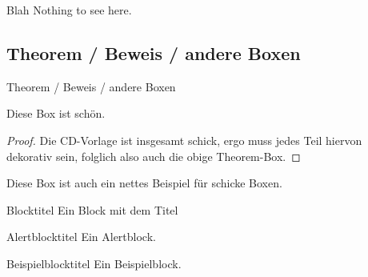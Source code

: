 \documentclass[utf8]{beamer}
\begin{document}
\begin{frame}{Blah}
Nothing to see here.
\end{frame}

\subsection{Theorem / Beweis / andere Boxen} 

\begin{frame}[allowframebreaks]{Theorem / Beweis / andere Boxen} %
   \begin{theorem}
      Diese Box ist sch\"on.
   \end{theorem}

   \begin{proof}
      Die CD-Vorlage ist insgesamt schick, ergo muss jedes Teil hiervon dekorativ sein, folglich also auch die obige Theorem-Box.
   \end{proof}

   \begin{example}
     Diese Box ist auch ein nettes Beispiel f\"ur schicke Boxen.
   \end{example}

   \begin{block}{Blocktitel}
      Ein Block mit dem Titel \insertblocktitle
   \end{block}

   \begin{alertblock}{Alertblocktitel}
      Ein Alertblock.
   \end{alertblock}

   \begin{exampleblock}{Beispielblocktitel}
      Ein Beispielblock.
   \end{exampleblock}

\end{frame}
\end{document}
